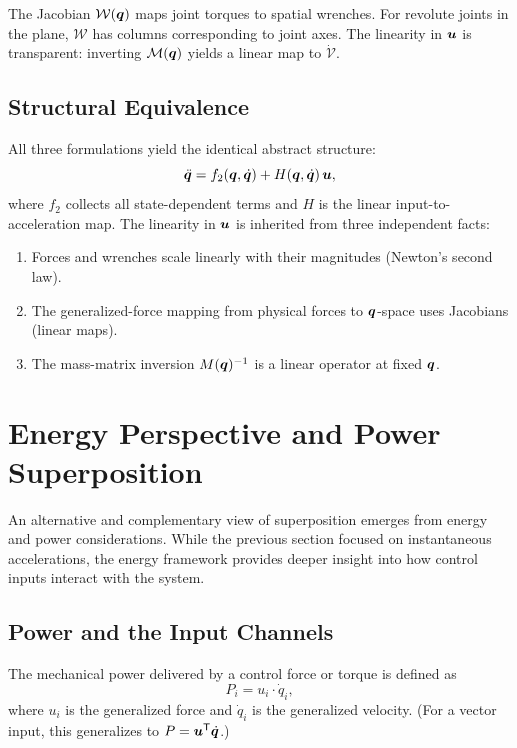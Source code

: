 The Jacobian $\mathcal{W}(\bm{q})$ maps joint torques to spatial wrenches. For revolute joints
in the plane, $\mathcal{W}$ has columns corresponding to joint axes. The linearity in $\bm{u}$
is transparent: inverting $\mathcal{M}(\bm{q})$ yields a linear map to $\dot{\mathcal{V}}$.

\subsection{Structural Equivalence}

All three formulations yield the identical abstract structure:
\begin{equation}
\ddot{\bm{q}} = f_2(\bm{q},\dot{\bm{q}}) + H(\bm{q},\dot{\bm{q}})\,\bm{u},
\label{eq:ch3:universal}
\end{equation}
where $f_2$ collects all state-dependent terms and $H$ is the linear input-to-acceleration
map. The linearity in $\bm{u}$ is inherited from three independent facts:
\begin{enumerate}
\item Forces and wrenches scale linearly with their magnitudes (Newton's second law).
\item The generalized-force mapping from physical forces to $\bm{q}$-space uses Jacobians
      (linear maps).
\item The mass-matrix inversion $M(\bm{q})^{-1}$ is a linear operator at fixed $\bm{q}$.
\end{enumerate}


\section{Energy Perspective and Power Superposition}

An alternative and complementary view of superposition emerges from energy and power
considerations. While the previous section focused on instantaneous accelerations, the
energy framework provides deeper insight into how control inputs interact with the system.

\subsection{Power and the Input Channels}

The mechanical power delivered by a control force or torque is defined as
\begin{equation}
P_i = u_i \cdot \dot q_i,
\label{eq:ch3:power-single}
\end{equation}
where $u_i$ is the generalized force and $\dot q_i$ is the generalized velocity. (For a
vector input, this generalizes to $P = \bm{u}^{\mathsf{T}} \dot{\bm{q}}$.)

